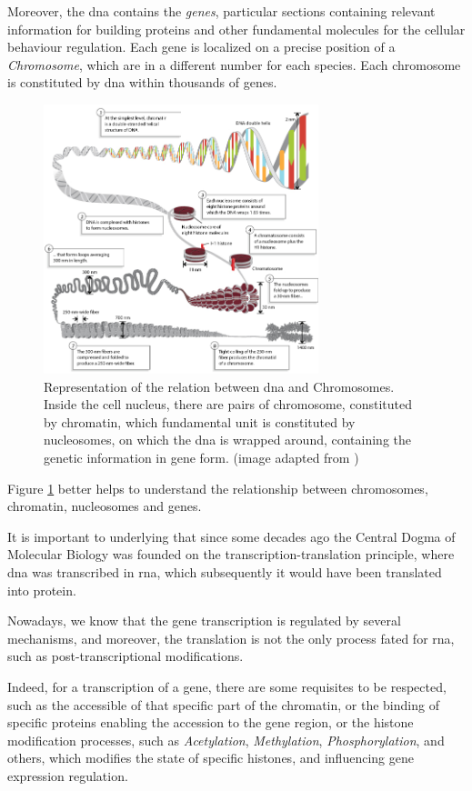 Moreover, the \gls{dna} contains the \textit{genes}, particular sections containing relevant information for building proteins and other fundamental molecules for the cellular behaviour regulation.
Each gene is localized on a precise position of a \textit{Chromosome}, which are in a different number for each species.
Each chromosome is constituted by \gls{dna} within thousands of genes.

\begin{figure}[h]
\centering
\includegraphics[width=8cm, keepaspectratio]{img/intro/dna2.jpg}
\caption[Chromosomes and \gls{dna}]{Representation of the relation between \gls{dna} and Chromosomes.
Inside the cell nucleus, there are pairs of chromosome, constituted by chromatin, which fundamental unit is constituted by nucleosomes, on which the \gls{dna} is wrapped around, containing the genetic information in gene form. (image adapted from \cite{Annunziato2008})}
\label{fig:dnachromosome}
\end{figure}

Figure \ref{fig:dnachromosome} better helps to understand the relationship between chromosomes, chromatin, nucleosomes and genes.

It is important to underlying that since some decades ago the Central Dogma of Molecular Biology was founded on the transcription-translation principle, where \gls{dna} was transcribed in \gls{rna}, which subsequently it would have been translated into protein.

Nowadays, we know that the gene transcription is regulated by several mechanisms, and moreover, the translation is not the only process fated for \gls{rna}, such as post-transcriptional modifications.

Indeed, for a transcription of a gene, there are some requisites to be respected, such as the accessible of that specific part of the chromatin, or the binding of specific proteins enabling the accession to the gene region, or the histone modification processes, such as \textit{Acetylation}, \textit{Methylation}, \textit{Phosphorylation}, and others, which modifies the state of specific histones, and influencing gene expression regulation. 
  
